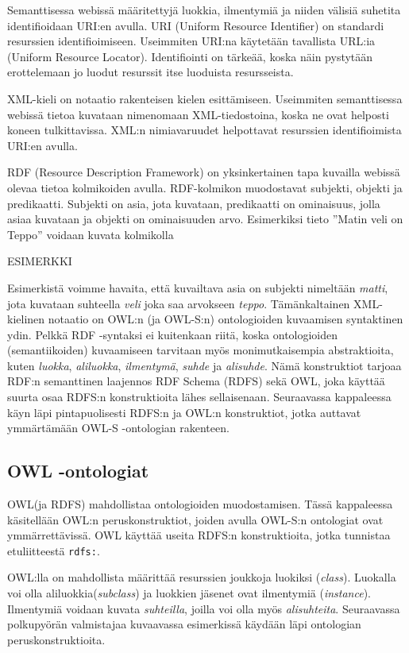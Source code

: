 \documentclass[finnish]{tktltiki2}
\theoremstyle{definition}
\theoremstyle{remark}
\begin{document}
Semanttisessa webissä määritettyjä luokkia, ilmentymiä ja niiden välisiä suhetita identifioidaan URI:en avulla\cite{semweb}.
URI (Uniform Resource Identifier) on standardi resurssien identifioimiseen. Useimmiten URI:na käytetään tavallista URL:ia (Uniform Resource Locator). Identifiointi on tärkeää, koska näin pystytään erottelemaan jo luodut resurssit itse luoduista resursseista. 

XML-kieli on notaatio rakenteisen kielen esittämiseen. Useimmiten semanttisessa webissä tietoa kuvataan nimenomaan XML-tiedostoina, koska ne ovat helposti koneen tulkittavissa. XML:n nimiavaruudet helpottavat resurssien identifioimista URI:en avulla. 

RDF (Resource Description Framework) on yksinkertainen tapa kuvailla webissä olevaa tietoa kolmikoiden avulla\cite{RDFP}. RDF-kolmikon muodostavat subjekti, objekti ja predikaatti\cite{RDFP}. Subjekti on asia, jota kuvataan, predikaatti on ominaisuus, jolla asiaa kuvataan ja objekti on ominaisuuden arvo. Esimerkiksi tieto ''Matin veli on Teppo'' voidaan kuvata kolmikolla 


ESIMERKKI


Esimerkistä voimme havaita, että kuvailtava asia on subjekti nimeltään \textit{matti}, jota kuvataan suhteella \textit{veli} joka saa arvokseen \textit{teppo}. Tämänkaltainen XML-kielinen notaatio on OWL:n (ja OWL-S:n) ontologioiden kuvaamisen syntaktinen ydin. Pelkkä RDF -syntaksi ei kuitenkaan riitä, koska ontologioiden (semantiikoiden) kuvaamiseen tarvitaan myös monimutkaisempia abstraktioita, kuten \textit{luokka}, \textit{aliluokka}, \textit{ilmentymä}, \textit{suhde} ja \textit{alisuhde}. Nämä konstruktiot tarjoaa RDF:n semanttinen laajennos RDF Schema (RDFS) sekä OWL, joka käyttää suurta osaa RDFS:n konstruktioita lähes sellaisenaan.  Seuraavassa kappaleessa käyn läpi pintapuolisesti RDFS:n ja OWL:n konstruktiot, jotka auttavat ymmärtämään OWL-S -ontologian rakenteen.

\subsection{OWL -ontologiat}

OWL(ja RDFS) mahdollistaa ontologioiden muodostamisen. Tässä kappaleessa käsitellään OWL:n peruskonstruktiot, joiden avulla OWL-S:n ontologiat ovat ymmärrettävissä. OWL käyttää useita RDFS:n konstruktioita, jotka tunnistaa etuliitteestä \texttt{rdfs:}.

OWL:lla on mahdollista määrittää resurssien joukkoja luokiksi (\textit{class}). Luokalla voi olla aliluokkia(\textit{subclass}) ja luokkien jäsenet ovat ilmentymiä (\textit{instance}). Ilmentymiä voidaan kuvata \textit{suhteilla}, joilla voi olla myös \textit{alisuhteita}\cite{owlguide}. Seuraavassa polkupyörän valmistajaa kuvaavassa esimerkissä käydään läpi ontologian peruskonstruktioita. 
\end{document}
